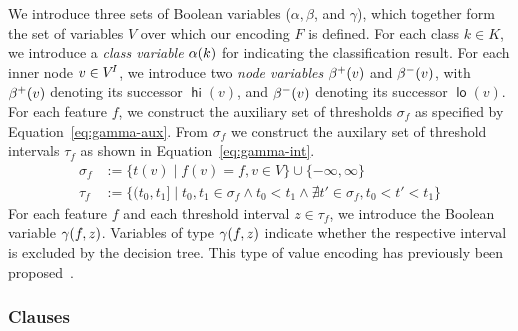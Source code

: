\documentclass{easychair}
\DeclareMathOperator\hi{\ensuremath{\mathsf{hi}}}
\DeclareMathOperator\lo{\ensuremath{\mathsf{lo}}}
\theoremstyle{definition}
\newtheorem{encoding}{Encoding}[section]
\begin{document}
We introduce three sets of Boolean variables ($\alpha, \beta$, and $\gamma$), which together form the set of variables $V$ over which our encoding $F$ is defined. 
For each class $k \in K$, we introduce a \emph{class variable} $\alpha(k)$ for indicating the classification result. 
For each inner node $v \in V^{\!I}$, we introduce two \emph{node variables} $\beta^+(v)$ and $\beta^-(v)$, with $\beta^+(v)$ denoting its successor $\hi(v)$, and $\beta^-(v)$ denoting its successor $\lo(v)$. 
For each feature $f$, we construct the auxiliary set of thresholds $\sigma_f$ as specified by Equation~\ref{eq:gamma-aux}. 
From $\sigma_f$ we construct the auxilary set of threshold intervals $\tau_f$ as shown in Equation~\ref{eq:gamma-int}. 
%
\begin{align}
\label{eq:gamma-aux}
\sigma_f &:= \{ t(v) \mid f(v) = f, v \in V \} \cup \{-\infty, \infty\}\\
\label{eq:gamma-int}
\tau_f &:= \{ (t_0, t_1] \mid t_0, t_1 \in \sigma_f \land t_0 < t_1 \land \nexists t' \in \sigma_f, t_0 < t' < t_1 \}
\end{align}
%
For each feature $f$ and each threshold interval $z \in \tau_f$, we introduce the Boolean variable $\gamma(f,z)$. 
Variables of type $\gamma(f,z)$ indicate whether the respective interval is excluded by the decision tree. 
This type of value encoding has previously been proposed~\cite{Choi:2020:RF}. 

\subsubsection{Clauses}

%
%
%
\end{document}
